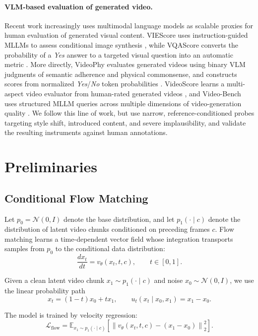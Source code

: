 \documentclass[letterpaper]{article} %
\begin{document}
\paragraph{VLM-based evaluation of generated video.}
Recent work increasingly uses multimodal language models as scalable proxies
for human evaluation of generated visual content. VIEScore uses
instruction-guided MLLMs to assess conditional image synthesis
\cite{viescore}, while VQAScore converts the probability of a
\emph{Yes} answer to a targeted visual question into an automatic metric
\cite{vqascore}. More directly, VideoPhy evaluates generated videos using
binary VLM judgments of semantic adherence and physical commonsense, and
constructs scores from normalized \emph{Yes}/\emph{No} token probabilities
\cite{videophy}. VideoScore learns a multi-aspect video evaluator from
human-rated generated videos \cite{videoscore}, and Video-Bench uses
structured MLLM queries across multiple dimensions of video-generation
quality \cite{videobench}. We follow this line of work, but use narrow,
reference-conditioned probes targeting style shift, introduced content, and
severe implausibility, and validate the resulting instruments against human
annotations.

\section{Preliminaries}
\subsection{Conditional Flow Matching}

Let $p_0 = \mathcal{N}(0,I)$ denote the base distribution, and let
$p_1(\cdot \mid c)$ denote the distribution of latent video chunks
conditioned on preceding frames $c$. Flow matching learns a
time-dependent vector field whose integration transports samples from
$p_0$ to the conditional data distribution:
\begin{equation}
\frac{d x_t}{d t} = v_\theta(x_t,t,c), \qquad t \in [0,1].
\end{equation}

Given a clean latent video chunk $x_1 \sim p_1(\cdot \mid c)$ and noise
$x_0 \sim \mathcal{N}(0,I)$, we use the linear probability path
\begin{equation}
x_t = (1-t)x_0 + t x_1,
\qquad
u_t(x_t \mid x_0,x_1) = x_1 - x_0.
\end{equation}

The model is trained by velocity regression:
\begin{equation}
\mathcal{L}_{\mathrm{flow}}
=
\mathbb{E}_{x_1 \sim p_1(\cdot \mid c)}
\left[
\left\|
v_\theta(x_t,t,c) - (x_1-x_0)
\right\|_2^2
\right].
\end{equation}
\end{document}
